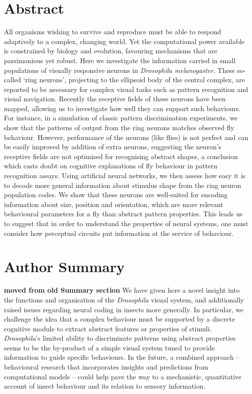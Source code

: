 \section*{Abstract}
All organisms wishing to survive and reproduce must be able to respond adaptively to a complex, changing world. Yet the computational power available is constrained by biology and evolution, favouring mechanisms that are parsimonious yet robust. Here we investigate the information carried in small populations of visually responsive neurons in \emph{Drosophila melanogaster}. These so-called `ring neurons', projecting to the ellipsoid body of the central complex, are reported to be necessary for complex visual tasks such as pattern recognition and visual navigation. Recently the receptive fields of these neurons have been mapped, allowing us to investigate how well they can support such behaviours. For instance, in a simulation of classic pattern discrimination experiments, we show that the patterns of output from the ring neurons matches observed fly behaviour. However, performance of the neurons (like flies) is not perfect and can be easily improved by addition of extra neurons, suggesting the neuron's receptive fields are not optimised for recognising abstract shapes, a conclusion which casts doubt on cognitive explanations of fly behaviour in pattern recognition assays. Using artificial neural networks, we then assess how easy it is to decode more general information about stimulus shape from the ring neuron population codes. We show that these neurons are well-suited for encoding information about size, position and orientation, which are more relevant behavioural parameters for a fly than abstract pattern properties. This leads us to suggest that in order to understand the properties of neural systems, one must consider how perceptual circuits put information at the service of behaviour.

\section*{Author Summary}
{\bf moved from old Summary section}
We have given here a novel insight into the functions and organisation of the \emph{Drosophila} visual system, and additionally raised issues regarding neural coding in insects more generally. In particular, we challenge the idea that a complex behaviour must be supported by a discrete cognitive module to extract abstract features or properties of stimuli. \emph{Drosophila}’s limited ability to discriminate patterns using abstract properties seems to be the by-product of a simple visual system tuned to provide information to guide specific behaviours. In the future, a combined approach – behavioural research that incorporates insights and predictions from computational models – could help pave the way to a mechanistic, quantitative account of insect behaviour and its relation to sensory information.

